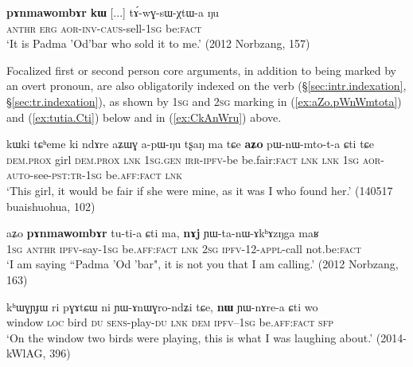 \begin{exe}
\ex \label{ex:pAnmawombAr.kW.Nu}
\gll  \textbf{pɤnmawombɤr} \textbf{kɯ} [...] tɤ́-wɣ-sɯ-χtɯ-a ŋu \\
\textsc{anthr} \textsc{erg} { } \textsc{aor}-\textsc{inv}-\textsc{caus}-sell-\textsc{1sg} be:\textsc{fact} \\
\glt `It is Padma 'Od'bar who sold it to me.' (2012 Norbzang, 157)
\end{exe} 

Focalized first or second person core arguments, in addition to being marked by an overt pronoun, are also obligatorily indexed on the verb (§\ref{sec:intr.indexation}, §\ref{sec:tr.indexation}), as shown by \textsc{1sg} and \textsc{2sg} marking in (\ref{ex:aZo.pWnWmtota}) and (\ref{ex:tutia.Cti}) below and in (\ref{ex:CkAnWru}) above.

\begin{exe}
\ex \label{ex:aZo.pWnWmtota}
\gll  kɯki tɕʰeme ki ndɤre aʑɯɣ a-pɯ-ŋu tʂaŋ ma tɕe \textbf{aʑo} pɯ-nɯ-mto-t-a ɕti tɕe \\
\textsc{dem}.\textsc{prox} girl  \textsc{dem}.\textsc{prox} \textsc{lnk} \textsc{1sg}.\textsc{gen} \textsc{irr}-\textsc{ipfv}-be be.fair:\textsc{fact} \textsc{lnk} \textsc{lnk} \textsc{1sg} \textsc{aor}-\textsc{auto}-see-\textsc{pst}:\textsc{tr}-\textsc{1sg} be.\textsc{aff}:\textsc{fact} \textsc{lnk} \\
\glt `This girl, it would be fair if she were mine, as it was I who found her.' (140517 buaishuohua, 102)
\end{exe}

\begin{exe}
\ex \label{ex:tutia.Cti}
\gll aʑo \textbf{pɤnmawombɤr} tu-ti-a ɕti ma, \textbf{nɤj} ɲɯ-ta-nɯ-ɤkʰɤzŋga maʁ  \\
\textsc{1sg}  \textsc{anthr} \textsc{ipfv}-say-\textsc{1sg} be.\textsc{aff}:\textsc{fact} \textsc{lnk} \textsc{2sg} \textsc{ipfv}-1\fl{}2-\textsc{appl}-call not.be:\textsc{fact} \\
\glt `I am saying ``Padma 'Od 'bar", it is not you that I am calling.' (2012 Norbzang, 163)
\end{exe}

 \begin{exe}
\ex \label{ex:nW.YWnArea}
\gll  kʰɯɣɲɟɯ ri pɣɤtɕɯ ni ɲɯ-ɤnɯɣro-ndʑi tɕe, \textbf{nɯ} ɲɯ-nɤre-a ɕti wo  \\
window \textsc{loc} bird \textsc{du} \textsc{sens}-play-\textsc{du} \textsc{lnk} \textsc{dem} \textsc{ipfv}--\textsc{1sg}  be.\textsc{aff}:\textsc{fact} \textsc{sfp} \\
\glt `On the window two birds were playing, this is what I was laughing about.' (2014-kWlAG, 396)
\end{exe}

